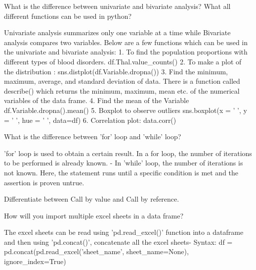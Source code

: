 	\begin{qanda}
		\begin{question}
What is the difference between univariate and bivariate analysis? What all different functions can be used in python?
		\end{question}
		\begin{answer}
Univariate analysis summarizes only one variable at a time while Bivariate analysis compares two variables. Below are a few functions which can be used in the univariate and bivariate analysis: 1. To find the population proportions with different types of blood disorders. df.Thal.value\_counts() 2. To make a plot of the distribution : sns.distplot(df.Variable.dropna()) 3. Find the minimum, maximum, average, and standard deviation of data. There is a function called describe() which returns the minimum, maximum, mean etc. of the numerical variables of the data frame. 4. Find the mean of the Variable df.Variable.dropna().mean() 5. Boxplot to observe outliers sns.boxplot(x = ' ', y = ' ', hue = ' ', data=df) 6. Correlation plot: data.corr()
		\end{answer}
	\end{qanda}

	\begin{qanda}
		\begin{question}
What is the difference between 'for' loop and 'while' loop?
		\end{question}
		\begin{answer}
'for' loop is used to obtain a certain result. In a for loop, the number of iterations to be performed is already known. - In 'while' loop, the number of iterations is not known. Here, the statement runs until a specific condition is met and the assertion is proven untrue.
		\end{answer}
	\end{qanda}

	\begin{qanda}
		\begin{question}
Differentiate between Call by value and Call by reference.
		\end{question}
		\begin{answer}

		\end{answer}
	\end{qanda}
How will you import multiple excel sheets in a data frame?	
	\begin{qanda}
		\begin{question}
The excel sheets can be read using 'pd.read\_excel()' function into a dataframe and then using 'pd.concat()', concatenate all the excel sheets- Syntax: df = pd.concat(pd.read\_excel('sheet\_name', sheet\_name=None), ignore\_index=True)
		\end{question}
		\begin{answer}

		\end{answer}
	\end{qanda}

